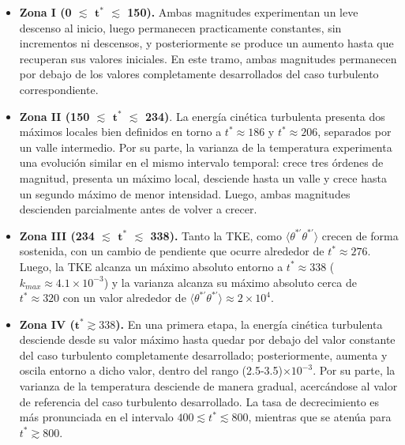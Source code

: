 \begin{itemize}
\item \textbf{Zona I (0 $\lesssim$ $\mathbf{t^*}$ $\lesssim$ 150).} Ambas magnitudes experimentan un leve descenso al inicio, luego permanecen practicamente constantes, sin incrementos ni descensos, y posteriormente se produce un aumento hasta que recuperan sus valores iniciales. En este tramo, ambas magnitudes permanecen por debajo de los valores completamente desarrollados del caso turbulento correspondiente. 

\item \textbf{Zona II (150 $\lesssim$ $\mathbf{t^*}$ $\lesssim$ 234)}. La energía cinética turbulenta presenta dos máximos locales bien definidos en torno a $t^*\approx186$ y $t^*\approx206$, separados por un valle intermedio. Por su parte, la varianza de la temperatura experimenta una evolución similar en el mismo intervalo temporal: crece tres órdenes de magnitud, presenta un máximo local, desciende hasta un valle y crece hasta un segundo máximo de menor intensidad. Luego, ambas magnitudes descienden parcialmente antes de volver a crecer.

\item \textbf{Zona III (234 $\lesssim$ $\mathbf{t^*}$ $\lesssim$ 338).} Tanto la TKE, como $\langle \theta^{* \prime} \theta^{* \prime} \rangle$ crecen de forma sostenida, con un cambio de pendiente que ocurre alrededor de $t^*\approx276$. Luego, la TKE alcanza un máximo absoluto entorno a $t^*\approx338$ ($k_{max} \approx 4\text{.}1 \times 10^{-3}$) y la varianza alcanza su máximo absoluto cerca de $t^*\approx320$ con un valor alrededor de $\langle \theta^{* \prime} \theta^{* \prime} \rangle \approx 2 \times 10^{4}$.

\item \textbf{Zona IV ($\mathbf{t^*} \gtrsim 338$).} En una primera etapa, la energía cinética turbulenta desciende desde su valor máximo hasta quedar por debajo del valor constante del caso turbulento completamente desarrollado; posteriormente, aumenta y oscila entorno a dicho valor, dentro del rango (2.5-3.5)$\times 10^{-3}$. Por su parte, la varianza de la temperatura desciende de manera gradual, acercándose al valor de referencia del caso turbulento desarrollado. La tasa de decrecimiento es más pronunciada en el intervalo $400 \lesssim t^* \lesssim 800$, mientras que se atenúa para $t^* \gtrsim 800$.
\end{itemize}


